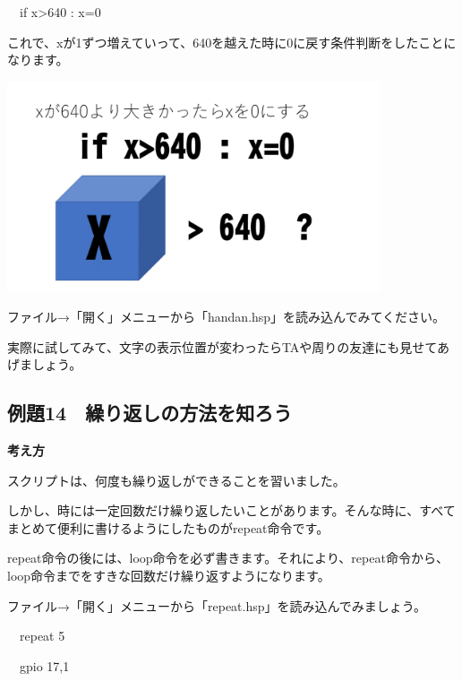 \documentclass[a4paper,12pt]{jarticle}
\begin{document}
\bigskip

\ \ if x{\textgreater}640 : x=0

\bigskip

これで、xが1ずつ増えていって、640を越えた時に0に戻す条件判断をしたことになります。

\bigskip
\bigskip

\begin{minipage}{9.781cm}
\centering
{\upshape
\includegraphics[keepaspectratio,width=11.033cm,height=6.209cm]{text02-img/text02-img052.png}}
\end{minipage}

\bigskip
\bigskip
\bigskip

ファイル→「開く」メニューから「handan.hsp」を読み込んでみてください。

実際に試してみて、文字の表示位置が変わったらTAや周りの友達にも見せてあげましょう。


\clearpage
\subsection{例題14　繰り返しの方法を知ろう}
\bigskip
\bigskip

{\bfseries
考え方}

\bigskip

スクリプトは、何度も繰り返しができることを習いました。

しかし、時には一定回数だけ繰り返したいことがあります。そんな時に、すべてまとめて便利に書けるようにしたものがrepeat命令です。

repeat命令の後には、loop命令を必ず書きます。それにより、repeat命令から、loop命令までをすきな回数だけ繰り返すようになります。

ファイル→「開く」メニューから「repeat.hsp」を読み込んでみましょう。

\bigskip

\ \ repeat 5

\ \ gpio 17,1
\end{document}

